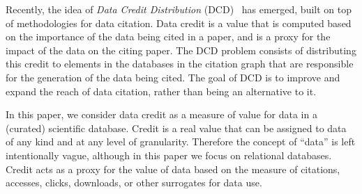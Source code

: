 \documentclass[preprint,12pt,sort&compress]{elsarticle}
\newcommand{\eat}[1]{}
\newcommand{\scream}[1]{{\bf * #1 *}{\typeout{#1}}}
\begin{document}
Recently, the idea of \emph{Data Credit Distribution} (DCD)~\citep{creditFang18,transitiveCreditKatz2014,zeng2020assigning} has emerged, built on top of methodologies for data citation. 
Data credit is a value that is computed based on the importance of the data being cited in a paper, and is a proxy for the impact of the data on the citing paper. 
The DCD problem consists of distributing this credit to elements in the databases in the citation graph that are responsible for the generation of the data being cited. The goal of DCD is to improve and expand the reach of data citation, rather than being an alternative to it. %

\eat{
\scream{GMS: the next paragraph can be removed. We need this in the related work, here it is optional/maybe also misleading.}
\textcolor{red}{\cite{katz2020SoftwareandData}  defined credit as a ``quantity'' that describes the importance of a research entity, such as papers or data mentioned in a citation, and proposed the idea of a \emph{distribution} of credit from research entities, such as papers or data, to other research entities through citations. 
This can be done by exploiting the structure of the \emph{citation graph}, a directed graph whose nodes are publications and edges are citations.
This graph is the model at the core of systems such as Google Scholar and the Web of Science.
\citet{zeng2020assigning} and \citet{creditFang18} further explored this concept by defining frameworks for the  computation and distribution of credit between papers, authors, and data used by papers in the citation graph. }
}

In this paper, \textcolor{correction}{we consider data credit as a measure of value for data} in a (curated) scientific database.  
\textcolor{correction}{Credit is a real value that can be assigned} to data of any kind and at any level of granularity. Therefore the concept of ``data'' is left intentionally vague, although in this paper we focus on relational databases.
Credit acts as a proxy for the value of data based on the measure of citations, accesses, clicks, downloads, or other surrogates for data use. 
\end{document}
